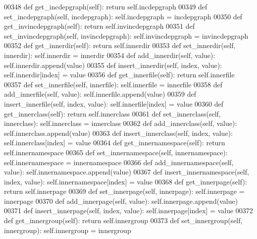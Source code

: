 \begin{DoxyCode}
{{{{{{{{{{{{{{{{{{{{{{{{00348     \textcolor{keyword}{def }get_incdepgraph(self): \textcolor{keywordflow}{return} self.incdepgraph
00349     \textcolor{keyword}{def }set_incdepgraph(self, incdepgraph): self.incdepgraph = incdepgraph
00350     \textcolor{keyword}{def }get_invincdepgraph(self): \textcolor{keywordflow}{return} self.invincdepgraph
00351     \textcolor{keyword}{def }set_invincdepgraph(self, invincdepgraph): self.invincdepgraph = invincdepgraph
00352     \textcolor{keyword}{def }get_innerdir(self): \textcolor{keywordflow}{return} self.innerdir
00353     \textcolor{keyword}{def }set_innerdir(self, innerdir): self.innerdir = innerdir
00354     \textcolor{keyword}{def }add_innerdir(self, value): self.innerdir.append(value)
00355     \textcolor{keyword}{def }insert_innerdir(self, index, value): self.innerdir[index] = value
00356     \textcolor{keyword}{def }get_innerfile(self): \textcolor{keywordflow}{return} self.innerfile
00357     \textcolor{keyword}{def }set_innerfile(self, innerfile): self.innerfile = innerfile
00358     \textcolor{keyword}{def }add_innerfile(self, value): self.innerfile.append(value)
00359     \textcolor{keyword}{def }insert_innerfile(self, index, value): self.innerfile[index] = value
00360     \textcolor{keyword}{def }get_innerclass(self): \textcolor{keywordflow}{return} self.innerclass
00361     \textcolor{keyword}{def }set_innerclass(self, innerclass): self.innerclass = innerclass
00362     \textcolor{keyword}{def }add_innerclass(self, value): self.innerclass.append(value)
00363     \textcolor{keyword}{def }insert_innerclass(self, index, value): self.innerclass[index] = value
00364     \textcolor{keyword}{def }get_innernamespace(self): \textcolor{keywordflow}{return} self.innernamespace
00365     \textcolor{keyword}{def }set_innernamespace(self, innernamespace): self.innernamespace = innernamespace
00366     \textcolor{keyword}{def }add_innernamespace(self, value): self.innernamespace.append(value)
00367     \textcolor{keyword}{def }insert_innernamespace(self, index, value): self.innernamespace[index] = value
00368     \textcolor{keyword}{def }get_innerpage(self): \textcolor{keywordflow}{return} self.innerpage
00369     \textcolor{keyword}{def }set_innerpage(self, innerpage): self.innerpage = innerpage
00370     \textcolor{keyword}{def }add_innerpage(self, value): self.innerpage.append(value)
00371     \textcolor{keyword}{def }insert_innerpage(self, index, value): self.innerpage[index] = value
00372     \textcolor{keyword}{def }get_innergroup(self): \textcolor{keywordflow}{return} self.innergroup
00373     \textcolor{keyword}{def }set_innergroup(self, innergroup): self.innergroup = innergroup
}}}}}}}}}}}}}}}}}}}}}}}}
\end{DoxyCode}
